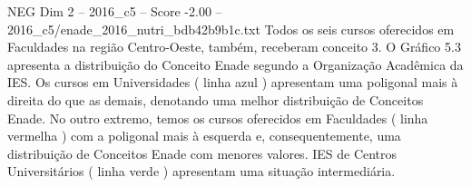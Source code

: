 \begin{textsample}{NEG Dim 2 – 2016\_c5 – Score -2.00 – 2016\_c5/enade\_2016\_nutri\_bdb42b9b1c.txt}
Todos os seis cursos oferecidos em Faculdades na região Centro-Oeste, também, receberam conceito 3.
O Gráfico 5.3 apresenta a distribuição do Conceito Enade segundo a Organização Acadêmica da IES.
Os cursos em Universidades ( linha azul ) apresentam uma poligonal mais à direita do que as demais, denotando uma melhor distribuição de Conceitos Enade.
No outro extremo, temos os cursos oferecidos em Faculdades ( linha vermelha ) com a poligonal mais à esquerda e, consequentemente, uma distribuição de Conceitos Enade com menores valores.
IES de Centros Universitários ( linha verde ) apresentam uma situação intermediária.

\end{textsample}
